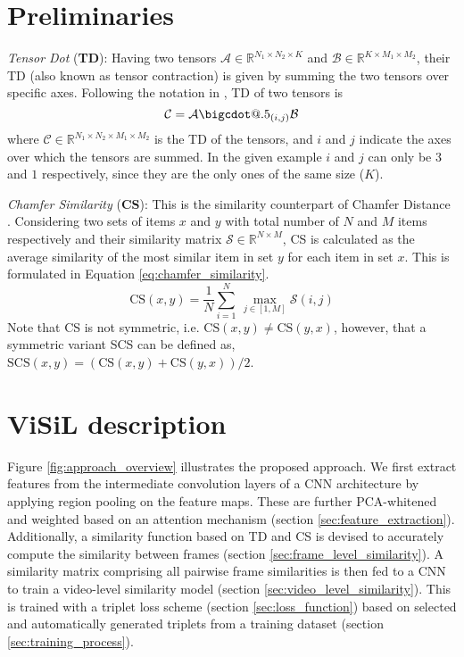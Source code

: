 \documentclass[10pt,twocolumn,letterpaper]{article}
\makeatletter
\newcommand*\bigcdot{\mathpalette\bigcdot@{.5}}
\newcommand*\bigcdot@[2]{\mathbin{\vcenter{\hbox{\scalebox{#2}{$\m@th#1\bullet$}}}}}
\makeatother
\begin{document}
\section{Preliminaries}
\label{sec:preliminaries}


\textit{Tensor Dot} (\textbf{TD}): Having two tensors $\mathcal{A} \in \mathbb{R}^{N_1 \times N_2 \times K}$ and $\mathcal{B} \in \mathbb{R}^{K \times M_1 \times M_2}$, their TD (also known as tensor contraction) is given by summing the two tensors over specific axes. Following the notation in \cite{yang2017}, TD of two tensors is
\begin{equation}
\mathcal{C} = \mathcal{A} \bigcdot _{(i,j)} \mathcal{B}
\label{eq:tensor_dot}
\end{equation}
where $\mathcal{C}\in \mathbb{R}^{N_1 \times N_2 \times M_1 \times M_2}$ is the TD of the tensors, and $i$ and $j$ indicate the axes over which the tensors are summed. In the given example $i$ and $j$ can only be $3$ and $1$ respectively, since they are the only ones of the same size ($K$). 

\textit{Chamfer Similarity} (\textbf{CS}): This is the similarity counterpart of Chamfer Distance \cite{barrow1977}. Considering two sets of items $x$ and $y$ with total number of $N$ and $M$ items respectively and their similarity matrix $\mathcal{S}\in \mathbb{R}^{N \times M}$, CS is calculated as the average similarity of the most similar item in set $y$ for each item in set $x$. This is formulated in Equation \ref{eq:chamfer_similarity}.
\begin{equation}
\text{CS}(x, y) = \frac{1}{N} \sum_{i=1}^{N} \, \max_{j \in [1,M]}  \mathcal{S}(i,j)
\label{eq:chamfer_similarity}
\end{equation}
Note that CS is not symmetric, i.e. $\text{CS}(x,y)\neq \text{CS}(y, x)$, however, that a symmetric variant SCS can be defined as, $\text{SCS}(x, y) = (\text{CS}(x, y) + \text{CS}(y, x))/2$.








\section{ViSiL description}

Figure \ref{fig:approach_overview} illustrates the proposed approach. We first extract features from the intermediate convolution layers of a CNN architecture by applying region pooling on the feature maps. These are further PCA-whitened and weighted based on an attention mechanism (section \ref{sec:feature_extraction}). Additionally, a similarity function based on TD and CS is devised to accurately compute the similarity between frames (section \ref{sec:frame_level_similarity}). A similarity matrix comprising all pairwise frame similarities is then fed to a CNN to train a video-level similarity model (section \ref{sec:video_level_similarity}). 
This is trained with a triplet loss scheme (section \ref{sec:loss_function}) based on selected and automatically generated triplets from a training dataset (section \ref{sec:training_process}). 
\end{document}
